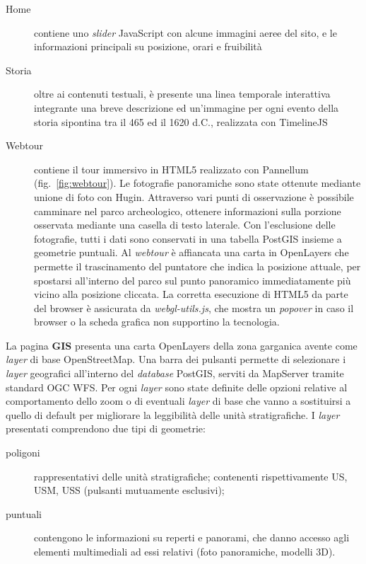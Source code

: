 \documentclass[svgnames,portrait,final,usenames,dvipsnames]{baposter}
\begin{document}
\begin{poster}
{\begin{multicols}{2}[][]
\begin{description}
                    \begin{description}
                        \item[Home] contiene uno \textit{slider} JavaScript con alcune immagini aeree del sito, e le informazioni principali su posizione, orari e fruibilità
                        \item[Storia] oltre ai contenuti testuali, è presente una linea temporale interattiva integrante una breve descrizione ed un'immagine per ogni evento della storia sipontina tra il 465 ed il 1620 d.C., realizzata con TimelineJS
                        \item[Webtour] contiene il tour immersivo in HTML5 realizzato con Pannellum (fig.~\ref{fig:webtour}). Le fotografie panoramiche sono state ottenute mediante unione di foto con Hugin. Attraverso vari punti di osservazione è possibile camminare nel parco archeologico, ottenere informazioni sulla porzione osservata mediante una casella di testo laterale. Con l'esclusione delle fotografie, tutti i dati sono conservati in una tabella PostGIS insieme a geometrie puntuali. Al \textit{webtour} è affiancata una carta in OpenLayers che permette il trascinamento del puntatore che indica la posizione attuale, per spostarsi all'interno del parco sul punto panoramico immediatamente più vicino alla posizione cliccata. La corretta esecuzione di HTML5 da parte del browser è assicurata da \emph{webgl-utils.js}, che mostra un \textit{popover} in caso il browser o la scheda grafica non supportino la tecnologia.
                    \end{description}

                \item[GIS]

                    La pagina \textbf{GIS} presenta una carta OpenLayers della zona garganica avente come \textit{layer} di base OpenStreetMap. Una barra dei pulsanti permette di selezionare i \textit{layer} geografici all'interno del \textit{database} PostGIS, serviti da MapServer tramite standard OGC WFS. Per ogni \textit{layer} sono state definite delle opzioni relative al comportamento dello zoom o di eventuali \textit{layer} di base che vanno a sostituirsi a quello di default per migliorare la leggibilità delle unità stratigrafiche. I \textit{layer} presentati comprendono due tipi di geometrie:

                    \vspace{-0.15cm}
                    \begin{description}
                        \item[poligoni] rappresentativi delle unità stratigrafiche; contenenti rispettivamente US, USM, USS (pulsanti mutuamente esclusivi);
                        \item[puntuali] contengono le informazioni su reperti e panorami, che danno accesso agli elementi multimediali ad essi relativi (foto panoramiche, modelli 3D).
                    \end{description}
                    

\end{description}
\end{multicols}}
\end{poster}
\end{document}
